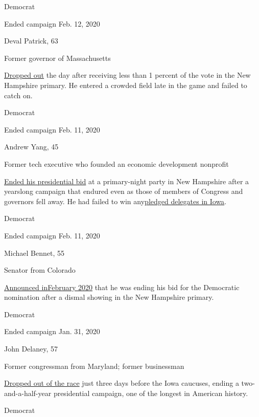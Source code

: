 Democrat

Ended campaign Feb. 12, 2020

Deval Patrick, 63

Former governor of Massachusetts

\href{https://www.nytimes3xbfgragh.onion/2020/02/12/us/politics/deval-patrick-drops-out.html}{Dropped
out} the day after receiving less than 1 percent of the vote in the New
Hampshire primary. He entered a crowded field late in the game and
failed to catch on.

Democrat

Ended campaign Feb. 11, 2020

Andrew Yang, 45

Former tech executive who founded an economic development nonprofit

\href{https://www.nytimes3xbfgragh.onion/2020/02/11/us/politics/andrew-yang-drops-out.html}{Ended
his presidential bid} at a primary-night party in New Hampshire after a
yearslong campaign that endured even as those of members of Congress and
governors fell away. He had failed to win
any\href{https://www.nytimes3xbfgragh.onion/interactive/2020/02/04/us/elections/results-iowa-caucus.html}{}\href{https://www.nytimes3xbfgragh.onion/interactive/2020/02/04/us/elections/results-iowa-caucus.html}{pledged
delegates in Iowa}.

Democrat

Ended campaign Feb. 11, 2020

Michael Bennet, 55

Senator from Colorado

\href{https://www.nytimes3xbfgragh.onion/2020/02/11/us/politics/michael-bennet-drops-out.html}{Announced
in}\href{https://www.nytimes3xbfgragh.onion/2020/02/11/us/politics/michael-bennet-drops-out.html}{February
2020} that he was ending his bid for the Democratic nomination after a
dismal showing in the New Hampshire primary.

Democrat

Ended campaign Jan. 31, 2020

John Delaney, 57

Former congressman from Maryland; former businessman

\href{https://www.nytimes3xbfgragh.onion/2020/01/31/us/politics/john-delaney-drops-out.html}{Dropped
out of the race} just three days before the Iowa caucuses, ending a
two-and-a-half-year presidential campaign, one of the longest in
American history.

Democrat

